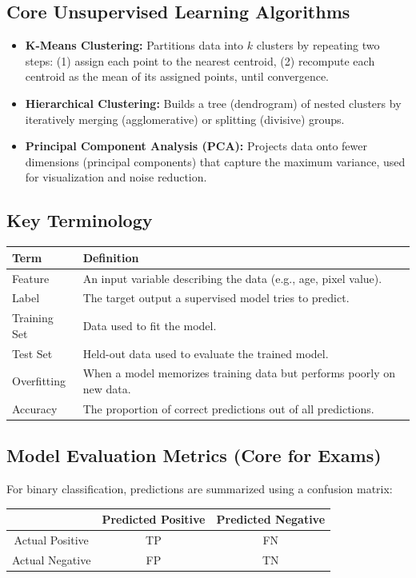 \documentclass[11pt,a4paper]{article}
\begin{document}
\subsection{Core Unsupervised Learning Algorithms}
\begin{itemize}[leftmargin=*]
  \item \textbf{K-Means Clustering:} Partitions data into $k$ clusters by repeating two steps: (1) assign each point to the nearest centroid, (2) recompute each centroid as the mean of its assigned points, until convergence.
  \item \textbf{Hierarchical Clustering:} Builds a tree (dendrogram) of nested clusters by iteratively merging (agglomerative) or splitting (divisive) groups.
  \item \textbf{Principal Component Analysis (PCA):} Projects data onto fewer dimensions (principal components) that capture the maximum variance, used for visualization and noise reduction.
\end{itemize}

\subsection{Key Terminology}
\begin{longtable}{@{}p{3.2cm}p{10.3cm}@{}}
\toprule
\rowcolor{primary!15}
\textbf{Term} & \textbf{Definition} \\
\midrule
\endhead
Feature & An input variable describing the data (e.g., age, pixel value). \\
\addlinespace
Label & The target output a supervised model tries to predict. \\
\addlinespace
Training Set & Data used to fit the model. \\
\addlinespace
Test Set & Held-out data used to evaluate the trained model. \\
\addlinespace
Overfitting & When a model memorizes training data but performs poorly on new data. \\
\addlinespace
Accuracy & The proportion of correct predictions out of all predictions. \\
\bottomrule
\end{longtable}

\subsection{Model Evaluation Metrics (Core for Exams)}
For binary classification, predictions are summarized using a confusion matrix:
\begin{center}
\begin{tabular}{c|c|c}
\toprule
 & Predicted Positive & Predicted Negative \\
\midrule
Actual Positive & TP & FN \\
Actual Negative & FP & TN \\
\bottomrule
\end{tabular}
\end{center}
\end{document}
